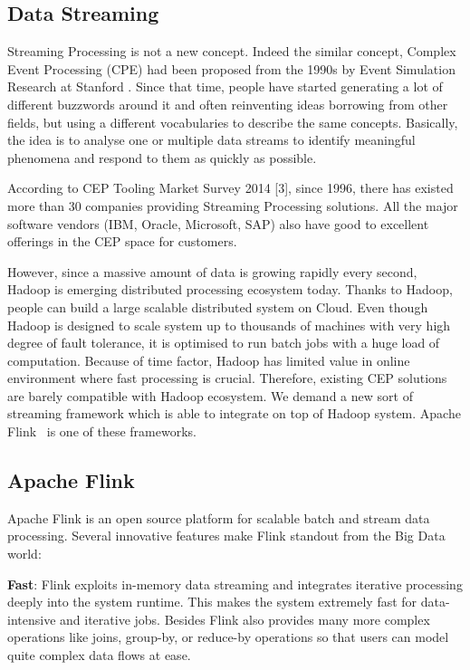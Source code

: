 \subsection*{Data Streaming}
Streaming Processing is not a new concept. Indeed the similar concept, Complex Event Processing (CPE) had been proposed from the 1990s by Event Simulation Research at Stanford \citep{Luckham:2001}. Since that time, people have started generating a lot of different buzzwords around it and often reinventing ideas borrowing from other fields, but using a different vocabularies to describe the same concepts. Basically, the idea is to analyse one or multiple data streams to identify meaningful phenomena and respond to them as quickly as possible. 


According to CEP Tooling Market Survey 2014 [3], since 1996, there has existed more than 30 companies providing Streaming Processing solutions. All the major software vendors (IBM, Oracle, Microsoft, SAP) also have good to excellent offerings in the CEP space for customers. 


However, since a massive amount of data is growing rapidly every second, Hadoop is emerging distributed processing ecosystem today. Thanks to Hadoop, people can build a large scalable distributed system on Cloud. Even though Hadoop is designed to scale system up to thousands of machines with very high degree of fault tolerance, it is optimised to run batch jobs with a huge load of computation. Because of time factor, Hadoop has limited value in online environment where fast processing is crucial. Therefore, existing CEP solutions are barely compatible with Hadoop ecosystem.  We demand a new sort of streaming framework which is able to integrate on top of Hadoop system. Apache Flink~\citep{flink} is one of these frameworks.


\subsection*{Apache Flink}

Apache Flink is an open source platform for scalable batch and stream data processing. Several innovative features make Flink standout from the Big Data world:

\textbf{Fast}: Flink exploits in-memory data streaming and integrates iterative processing deeply into the system runtime. This makes the system extremely fast for data-intensive and iterative jobs. Besides Flink also provides many more complex operations like joins, group-by, or reduce-by operations so that users can model quite complex data flows at ease.

